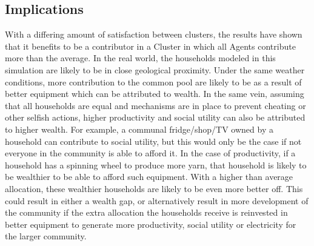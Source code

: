 \subsection*{Implications}
With a differing amount of satisfaction between clusters, the results have shown that it benefits to be a contributor in a Cluster in which all Agents contribute more than the average. In the real world, the households modeled in this simulation are likely to be in close geological proximity. Under the same weather conditions, more contribution to the common pool are likely to be as a result of better equipment which can be attributed to wealth. In the same vein, assuming that all households are equal and mechanisms are in place to prevent cheating or other selfish actions, higher productivity and social utility can also be attributed to higher wealth. For example, a communal fridge/shop/TV owned by a household can contribute to social utility, but this would only be the case if not everyone in the community is able to afford it. In the case of productivity, if a household has a spinning wheel to produce more yarn, that household is likely to be wealthier to be able to afford such equipment. 
With a higher than average allocation, these wealthier households are likely to be even more better off. This could result in either a wealth gap, or alternatively result in more development of the community if the extra allocation the households receive is reinvested in better equipment to generate more productivity, social utility or electricity for the larger community.

